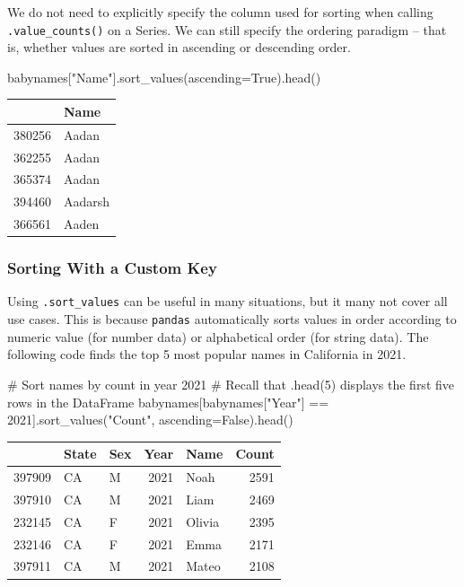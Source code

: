 \documentclass[
  letterpaper,
  DIV=11,
  numbers=noendperiod]{scrreprt}
\newenvironment{Shaded}{\begin{snugshade}}{\end{snugshade}}
\newcommand{\CommentTok}[1]{\textcolor[rgb]{0.37,0.37,0.37}{#1}}
\newcommand{\DecValTok}[1]{\textcolor[rgb]{0.68,0.00,0.00}{#1}}
\newcommand{\NormalTok}[1]{\textcolor[rgb]{0.00,0.23,0.31}{#1}}
\newcommand{\OperatorTok}[1]{\textcolor[rgb]{0.37,0.37,0.37}{#1}}
\newcommand{\StringTok}[1]{\textcolor[rgb]{0.13,0.47,0.30}{#1}}
\newcommand{\VariableTok}[1]{\textcolor[rgb]{0.07,0.07,0.07}{#1}}
\begin{document}
We do not need to explicitly specify the column used for sorting when
calling \texttt{.value\_counts()} on a Series. We can still specify the
ordering paradigm -- that is, whether values are sorted in ascending or
descending order.

\begin{Shaded}
\begin{Highlighting}[]
\NormalTok{babynames[}\StringTok{"Name"}\NormalTok{].sort\_values(ascending}\OperatorTok{=}\VariableTok{True}\NormalTok{).head()}
\end{Highlighting}
\end{Shaded}

\begin{tabular}{ll}
\toprule
{} &     Name \\
\midrule
380256 &    Aadan \\
362255 &    Aadan \\
365374 &    Aadan \\
394460 &  Aadarsh \\
366561 &    Aaden \\
\bottomrule
\end{tabular}

\hypertarget{sorting-with-a-custom-key}{%
\subsubsection{Sorting With a Custom
Key}\label{sorting-with-a-custom-key}}

Using \texttt{.sort\_values} can be useful in many situations, but it
many not cover all use cases. This is because \texttt{pandas}
automatically sorts values in order according to numeric value (for
number data) or alphabetical order (for string data). The following code
finds the top 5 most popular names in California in 2021.

\begin{Shaded}
\begin{Highlighting}[]
\CommentTok{\# Sort names by count in year 2021}
\CommentTok{\# Recall that \textasciigrave{}.head(5)\textasciigrave{} displays the first five rows in the DataFrame}
\NormalTok{babynames[babynames[}\StringTok{"Year"}\NormalTok{] }\OperatorTok{==} \DecValTok{2021}\NormalTok{].sort\_values(}\StringTok{"Count"}\NormalTok{, ascending}\OperatorTok{=}\VariableTok{False}\NormalTok{).head()}
\end{Highlighting}
\end{Shaded}

\begin{tabular}{lllrlr}
\toprule
{} & State & Sex &  Year &    Name &  Count \\
\midrule
397909 &    CA &   M &  2021 &    Noah &   2591 \\
397910 &    CA &   M &  2021 &    Liam &   2469 \\
232145 &    CA &   F &  2021 &  Olivia &   2395 \\
232146 &    CA &   F &  2021 &    Emma &   2171 \\
397911 &    CA &   M &  2021 &   Mateo &   2108 \\
\bottomrule
\end{tabular}
\end{document}
